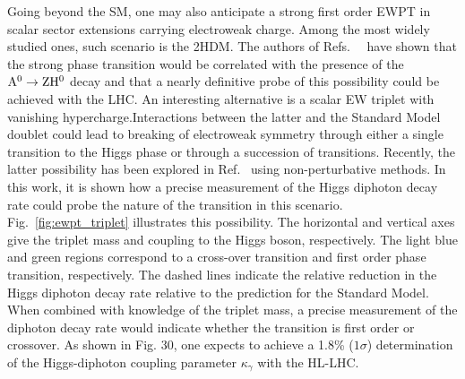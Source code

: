 Going beyond the SM, one may also anticipate a strong first order EWPT in scalar sector extensions carrying electroweak charge. Among the most widely studied ones, such scenario is the 2HDM. The authors of Refs.~~\cite{Dorsch:2013wja,Dorsch:2014qja} have shown that the strong phase transition would be correlated with the presence of the\linebreak $\rm A^0\to Z H^0$ decay and that a nearly definitive probe of this possibility could be achieved with the LHC. An interesting alternative is a scalar EW triplet with vanishing hypercharge.Interactions between the latter and the Standard Model doublet could lead to breaking of electroweak symmetry through either a single transition to the Higgs phase or through a succession of transitions\cite{Patel:2012pi}. Recently, the latter possibility has been explored in Ref.~\cite{Niemi:2018asa} using non-perturbative methods. In this work, it is shown how a precise measurement of the Higgs diphoton decay rate could probe the nature of the transition in this scenario. Fig.~\ref{fig:ewpt_triplet} illustrates this possibility. The horizontal and vertical axes give the triplet mass and coupling to the Higgs boson, respectively. The light blue and green regions correspond to a cross-over transition and first order phase transition, respectively. The dashed lines indicate the relative reduction in the Higgs diphoton decay rate relative to the prediction for the Standard Model. When combined with knowledge of the triplet mass, a precise measurement of the diphoton decay rate would indicate whether the transition is first order or crossover. As shown in Fig. 30, one expects to achieve a 1.8\% ($1\sigma$) determination of the Higgs-diphoton coupling parameter $\kappa_\gamma$ with the HL-LHC.




